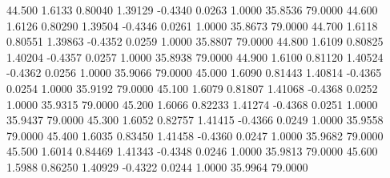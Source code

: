   44.500   1.6133   0.80040   1.39129  -0.4340   0.0263   1.0000  35.8536  79.0000
  44.600   1.6126   0.80290   1.39504  -0.4346   0.0261   1.0000  35.8673  79.0000
  44.700   1.6118   0.80551   1.39863  -0.4352   0.0259   1.0000  35.8807  79.0000
  44.800   1.6109   0.80825   1.40204  -0.4357   0.0257   1.0000  35.8938  79.0000
  44.900   1.6100   0.81120   1.40524  -0.4362   0.0256   1.0000  35.9066  79.0000
  45.000   1.6090   0.81443   1.40814  -0.4365   0.0254   1.0000  35.9192  79.0000
  45.100   1.6079   0.81807   1.41068  -0.4368   0.0252   1.0000  35.9315  79.0000
  45.200   1.6066   0.82233   1.41274  -0.4368   0.0251   1.0000  35.9437  79.0000
  45.300   1.6052   0.82757   1.41415  -0.4366   0.0249   1.0000  35.9558  79.0000
  45.400   1.6035   0.83450   1.41458  -0.4360   0.0247   1.0000  35.9682  79.0000
  45.500   1.6014   0.84469   1.41343  -0.4348   0.0246   1.0000  35.9813  79.0000
  45.600   1.5988   0.86250   1.40929  -0.4322   0.0244   1.0000  35.9964  79.0000
